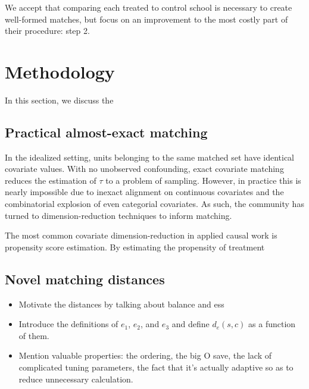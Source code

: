 \documentclass[aoas]{imsart}
\theoremstyle{plain}
\theoremstyle{definition}
\begin{document}
We accept that comparing each treated to control school is necessary to create well-formed matches, but focus on an improvement to the most costly part of their procedure: step 2.


\section{Methodology}
In this section, we discuss the 


\subsection{Practical almost-exact matching}

In the idealized setting, units belonging to the same matched set have identical covariate values. With no unobserved confounding, exact covariate matching reduces the estimation of $\tau$ to a problem of sampling. However, in practice this is nearly impossible due to inexact alignment on continuous covariates and the combinatorial explosion of even categorial covariates. As such, the community has turned to dimension-reduction techniques to inform matching.  

The most common covariate dimension-reduction in applied causal work is propensity score estimation. By estimating the propensity of treatment  





\subsection{Novel matching distances}

\begin{itemize}
  \item Motivate the distances by talking about balance and ess
  \item Introduce the definitions of $e_1$, $e_2$, and $e_3$ and define $d_e(s, c)$ as a function of them.
  \item Mention valuable properties: the ordering, the big O save, the lack of complicated tuning parameters, the fact that it's actually adaptive so as to reduce unnecessary calculation.
\end{itemize}
\end{document}
